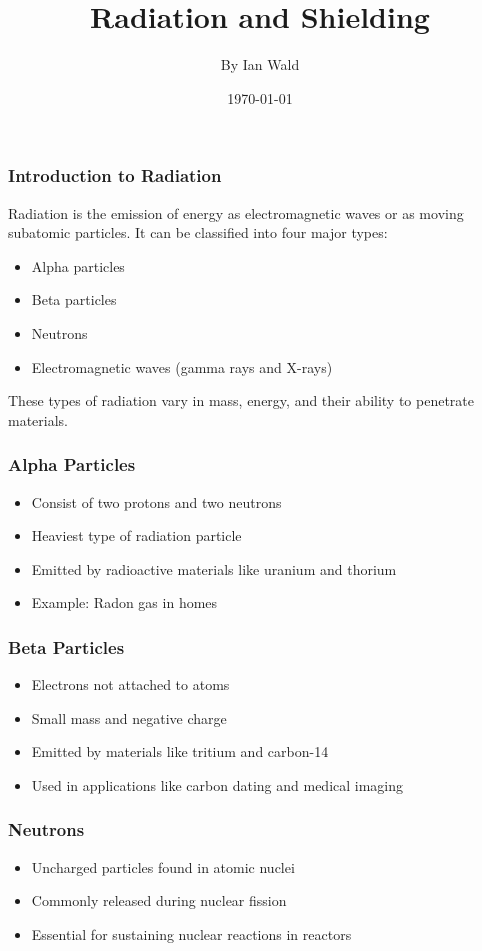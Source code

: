 \documentclass[aspectratio=169]{beamer}
\title{Radiation and Shielding}
\author{By Ian Wald}
\date{\today}
\begin{document}
\frame{\titlepage}

\begin{frame}
\vspace{0.5cm}
\frametitle{Introduction to Radiation}
Radiation is the emission of energy as electromagnetic waves or as moving subatomic particles. It can be classified into four major types:
\begin{itemize}
    \item Alpha particles
    \item Beta particles
    \item Neutrons
    \item Electromagnetic waves (gamma rays and X-rays)
\end{itemize}
These types of radiation vary in mass, energy, and their ability to penetrate materials.
\end{frame}

\begin{frame}
\frametitle{Alpha Particles}
\begin{itemize}
    \item Consist of two protons and two neutrons
    \item Heaviest type of radiation particle
    \item Emitted by radioactive materials like uranium and thorium
    \item Example: Radon gas in homes
\end{itemize}
\end{frame}

\begin{frame}
\frametitle{Beta Particles}
\begin{itemize}
    \item Electrons not attached to atoms
    \item Small mass and negative charge
    \item Emitted by materials like tritium and carbon-14
    \item Used in applications like carbon dating and medical imaging
\end{itemize}
\end{frame}

\begin{frame}
\frametitle{Neutrons}
\begin{itemize}
    \item Uncharged particles found in atomic nuclei
    \item Commonly released during nuclear fission
    \item Essential for sustaining nuclear reactions in reactors
\end{itemize}
\end{frame}
\end{document}
